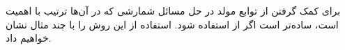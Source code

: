 \p
برای کمک گرفتن از توابع مولد در حل مسائل شمارشی که در آن‌ها ترتیب با اهمیت است،
ساده‌تر است اگر از  استفاده شود.
استفاده از این روش را با چند مثال نشان خواهیم داد.



